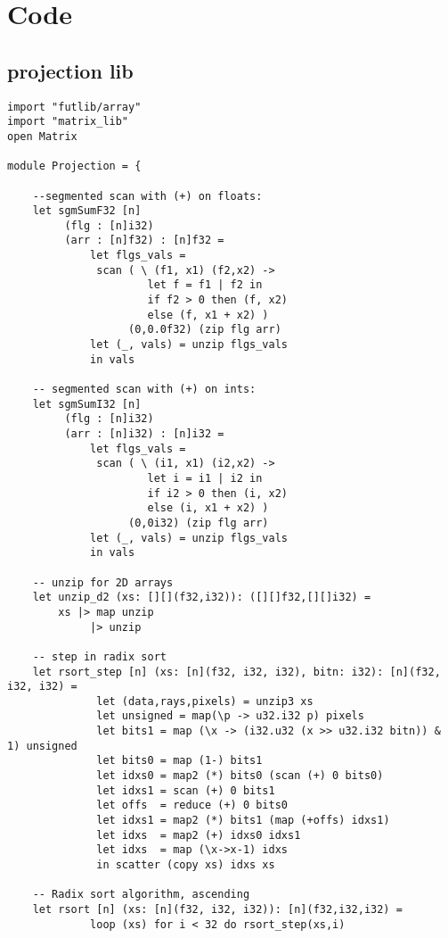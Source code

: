 \section{Code}
\subsection{projection lib}
\begin{lstlisting}[language=Futhark]
import "futlib/array"
import "matrix_lib"
open Matrix

module Projection = {

    --segmented scan with (+) on floats:
    let sgmSumF32 [n]
         (flg : [n]i32)
         (arr : [n]f32) : [n]f32 =
             let flgs_vals =
              scan ( \ (f1, x1) (f2,x2) ->
                      let f = f1 | f2 in
                      if f2 > 0 then (f, x2)
                      else (f, x1 + x2) )
                   (0,0.0f32) (zip flg arr)
             let (_, vals) = unzip flgs_vals
             in vals

    -- segmented scan with (+) on ints:
    let sgmSumI32 [n]
         (flg : [n]i32)
         (arr : [n]i32) : [n]i32 =
             let flgs_vals =
              scan ( \ (i1, x1) (i2,x2) ->
                      let i = i1 | i2 in
                      if i2 > 0 then (i, x2)
                      else (i, x1 + x2) )
                   (0,0i32) (zip flg arr)
             let (_, vals) = unzip flgs_vals
             in vals

    -- unzip for 2D arrays
    let unzip_d2 (xs: [][](f32,i32)): ([][]f32,[][]i32) =
        xs |> map unzip
             |> unzip

    -- step in radix sort
    let rsort_step [n] (xs: [n](f32, i32, i32), bitn: i32): [n](f32, i32, i32) =
              let (data,rays,pixels) = unzip3 xs
              let unsigned = map(\p -> u32.i32 p) pixels
              let bits1 = map (\x -> (i32.u32 (x >> u32.i32 bitn)) & 1) unsigned
              let bits0 = map (1-) bits1
              let idxs0 = map2 (*) bits0 (scan (+) 0 bits0)
              let idxs1 = scan (+) 0 bits1
              let offs  = reduce (+) 0 bits0
              let idxs1 = map2 (*) bits1 (map (+offs) idxs1)
              let idxs  = map2 (+) idxs0 idxs1
              let idxs  = map (\x->x-1) idxs
              in scatter (copy xs) idxs xs

    -- Radix sort algorithm, ascending
    let rsort [n] (xs: [n](f32, i32, i32)): [n](f32,i32,i32) =
             loop (xs) for i < 32 do rsort_step(xs,i)


\end{lstlisting}
